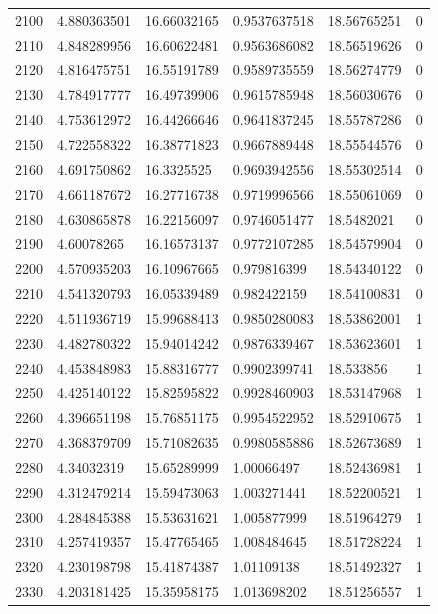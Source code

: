 \begin{longtable}{llllll}
2100 & 4.880363501 & 16.66032165 & 0.9537637518 & 18.56765251 & 0 \\
2110 & 4.848289956 & 16.60622481 & 0.9563686082 & 18.56519626 & 0 \\
2120 & 4.816475751 & 16.55191789 & 0.9589735559 & 18.56274779 & 0 \\
2130 & 4.784917777 & 16.49739906 & 0.9615785948 & 18.56030676 & 0 \\
2140 & 4.753612972 & 16.44266646 & 0.9641837245 & 18.55787286 & 0 \\
2150 & 4.722558322 & 16.38771823 & 0.9667889448 & 18.55544576 & 0 \\
2160 & 4.691750862 & 16.3325525 & 0.9693942556 & 18.55302514 & 0 \\
2170 & 4.661187672 & 16.27716738 & 0.9719996566 & 18.55061069 & 0 \\
2180 & 4.630865878 & 16.22156097 & 0.9746051477 & 18.5482021 & 0 \\
2190 & 4.60078265 & 16.16573137 & 0.9772107285 & 18.54579904 & 0 \\
2200 & 4.570935203 & 16.10967665 & 0.979816399 & 18.54340122 & 0 \\
2210 & 4.541320793 & 16.05339489 & 0.982422159 & 18.54100831 & 0 \\
2220 & 4.511936719 & 15.99688413 & 0.9850280083 & 18.53862001 & 1 \\
2230 & 4.482780322 & 15.94014242 & 0.9876339467 & 18.53623601 & 1 \\
2240 & 4.453848983 & 15.88316777 & 0.9902399741 & 18.533856 & 1 \\
2250 & 4.425140122 & 15.82595822 & 0.9928460903 & 18.53147968 & 1 \\
2260 & 4.396651198 & 15.76851175 & 0.9954522952 & 18.52910675 & 1 \\
2270 & 4.368379709 & 15.71082635 & 0.9980585886 & 18.52673689 & 1 \\
2280 & 4.34032319 & 15.65289999 & 1.00066497 & 18.52436981 & 1 \\
2290 & 4.312479214 & 15.59473063 & 1.003271441 & 18.52200521 & 1 \\
2300 & 4.284845388 & 15.53631621 & 1.005877999 & 18.51964279 & 1 \\
2310 & 4.257419357 & 15.47765465 & 1.008484645 & 18.51728224 & 1 \\
2320 & 4.230198798 & 15.41874387 & 1.01109138 & 18.51492327 & 1 \\
2330 & 4.203181425 & 15.35958175 & 1.013698202 & 18.51256557 & 1 \\

\end{longtable}
